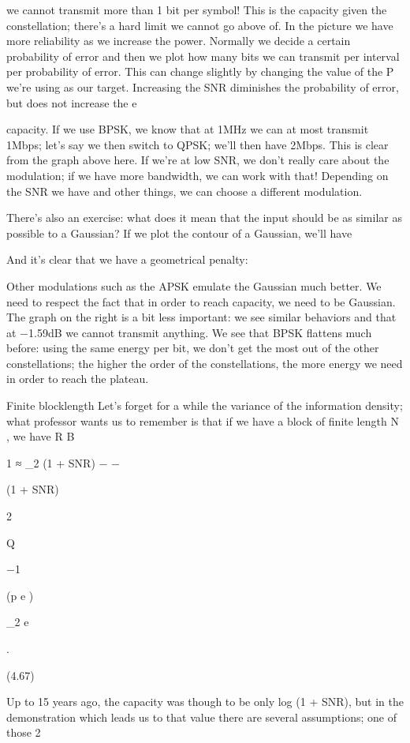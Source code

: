 {{{{{we cannot transmit more than 1 bit per symbol! This is the capacity given the constellation; there's a hard limit we cannot go above of. In the picture we have more reliability as we increase the power.
Normally we decide a certain probability of error and then we plot how many bits we can transmit per interval per probability of error. This can change slightly by changing the value of the P we're using as our target.
Increasing the SNR diminishes the probability of error, but does not increase the e

capacity.
If we use BPSK, we know that at 1MHz we can at most transmit 1Mbps; let's say we then switch to QPSK; we'll then have 2Mbps.
This is clear from the graph above here. If we're at low SNR, we don't really care about the modulation; if we have more bandwidth, we can work with that! Depending on the SNR we have and other things, we can choose a different modulation.

There's also an exercise: what does it mean that the input should be as similar as possible to a Gaussian? If we plot the contour of a Gaussian, we'll have

And it's clear that we have a geometrical penalty:

Other modulations such as the APSK emulate the Gaussian much better.
We need to respect the fact that in order to reach capacity, we need to be Gaussian.
The graph on the right is a bit less important: we see similar behaviors and that at
−1.59dB we cannot transmit anything. We see that BPSK flattens much before: using the same energy per bit, we don't get the most out of the other constellations; the higher the order of the constellations, the more energy we need in order to reach the plateau.

Finite blocklength Let's forget for a while the variance of the information density; what professor wants us to remember is that if we have a block of finite length N , we have R B

1
≈ \log_2 (1 + SNR) −  −

(1 + SNR)

2

Q

−1

(p e )

\log_2 e

.

(4.67)

\sqrtN

Up to 15 years ago, the capacity was though to be only log (1 + SNR), but in the demonstration which leads us to that value there are several assumptions; one of those 2

}}}}}

